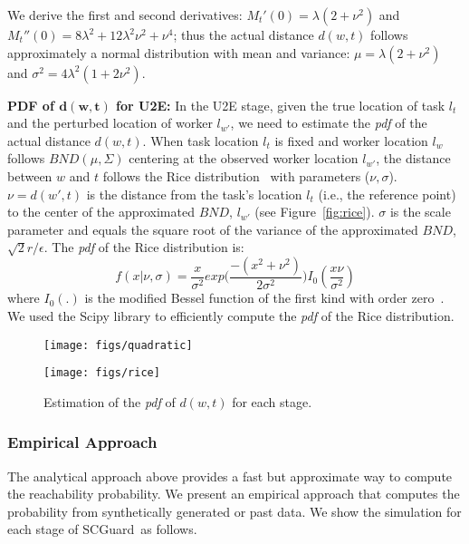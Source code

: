 \documentclass{USC-Thesis}
\newcommand{\SCG}{{SCGuard}}
\numberwithin{equation}{chapter}
\begin{document}
We derive the first and second derivatives: $M_t'(0)=\lambda(2+\nu^2)$ and $M_t''(0)=8\lambda^2+12\lambda^2\nu^2+\nu^4$; thus the actual distance $d(w,t)$ follows approximately a normal distribution with mean and variance: $\mu=\lambda(2+\nu^2)$ and $\sigma^2=4\lambda^2(1+2\nu^2)$.

\textbf{PDF of $\mathbf{d(w,t)}$ for U2E:} 
In the U2E stage, given the true location of task $l_t$ and the perturbed location of worker $l_{w'}$, we need to estimate the \emph{pdf} of the actual distance $d(w,t)$.
When task location $l_t$ is fixed and worker location $l_w$ follows $\mathit{BND(\mu,\Sigma)}$ centering at the observed worker location $l_{w'}$, the distance between $w$ and $t$ follows the Rice distribution~\cite{stuber2001principles} with parameters ($\nu,\sigma$). $\nu=d(w',t)$ is the distance from the task's location $l_t$ (i.e., the reference point) to the center of the approximated $\mathit{BND}$, $l_{w'}$ (see Figure~\ref{fig:rice}). $\sigma$ is the scale parameter and equals the square root of the variance of the approximated $\mathit{BND}$, $\sqrt{2}r/\epsilon$. The \emph{pdf} of the Rice distribution is:
$$f(x|\nu,\sigma)=\frac{x}{\sigma^2}exp\big(\frac{-(x^2+\nu^2)}{2\sigma^2}\big)I_0(\frac{x\nu}{\sigma^2})$$
where $I_0(.)$ is the modified Bessel function of the first kind with order zero~\cite{abramowitz1966handbook}.
We used the Scipy library to efficiently compute the \emph{pdf} of the Rice distribution.

\begin{figure}[ht]
	\begin{minipage}[b]{.45\linewidth}
		\centering
		\texttt{[image: figs/quadratic]}
		\label{fig:quadratic}
	\end{minipage}
	\vspace{10pt}
	\begin{minipage}[b]{.45\linewidth}
		\centering
		\texttt{[image: figs/rice]}
		\label{fig:rice}
	\end{minipage}
	\caption{Estimation of the \emph{pdf} of $d(w,t)$ for each stage.}
    \label{fig:reachability_estimation}
\end{figure}

\subsubsection{Empirical Approach}
\label{sec:empirical}

The analytical approach above provides a fast but approximate way to compute the reachability probability. We present an empirical approach that computes the probability from synthetically generated or past data. We show the simulation for each stage of \SCG\ as follows.
\end{document}
